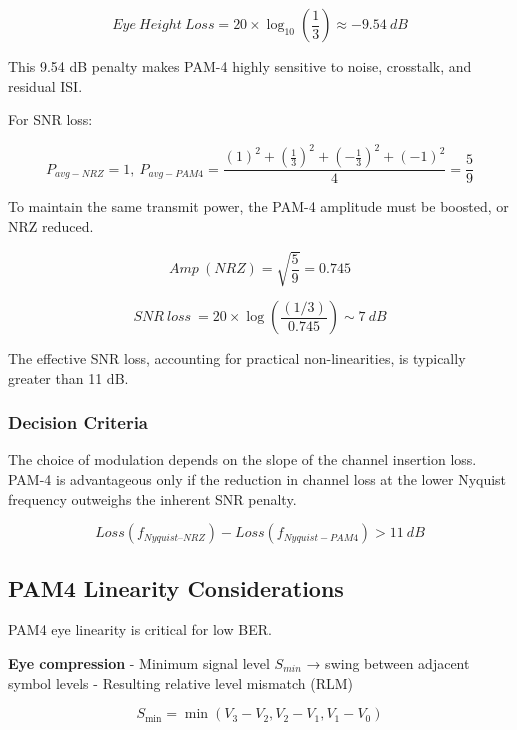 \begin{equation}
    Eye\ Height\ Loss = 20 \times \log_{10}{\left(\frac{1}{3}\right)} \approx -9.54\ dB \tag{2.3}
\end{equation}

This 9.54 dB penalty makes PAM-4 highly sensitive to noise, crosstalk, and residual ISI.

For SNR loss:

\begin{equation}
    P_{avg - NRZ} = 1 ,\ P_{avg - PAM4} = \frac{(1)^2 + \left( \frac{1}{3} \right)^2 + \left( - \frac{1}{3} \right)^2 + ( - 1)^2}{4} = \frac{5}{9} \tag{2.4}
\end{equation}

To maintain the same transmit power, the PAM-4 amplitude must be boosted, or NRZ reduced.

\begin{equation}
    Amp\ (NRZ) = \sqrt{\frac{5}{9}} = 0.745 \tag{2.5}
\end{equation}

\begin{equation}
    SNR\ loss\ = 20 \times \log\left(\frac{(1/3)}{0.745}\right) \sim 7\ dB \tag{2.6}
\end{equation}

The effective SNR loss, accounting for practical non-linearities, is typically greater than 11 dB.

\subsubsection*{Decision Criteria}
The choice of modulation depends on the slope of the channel insertion loss. PAM-4 is advantageous only if the reduction in channel loss at the lower 
Nyquist frequency outweighs the inherent SNR penalty.

\begin{equation}
    Loss(f_{Nyquist–NRZ}) - Loss(f_{Nyquist - PAM4}) > 11\ dB \tag{2.7}
\end{equation}

\subsection*{PAM4 Linearity Considerations}
PAM4 eye linearity is critical for low BER.

\textbf{Eye compression}
- Minimum signal level $S_{min}$ → swing between adjacent symbol levels
- Resulting relative level mismatch (RLM)

\begin{equation}
    S_{\min} = \min{(V_3 - V_2 , V_2 - V_1 , V_1 - V_0)} \tag{2.8}
\end{equation}

